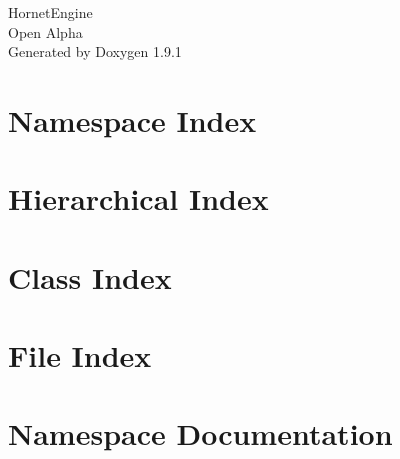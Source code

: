\let\mypdfximage\pdfximage\def\pdfximage{\immediate\mypdfximage}\documentclass[twoside]{book}
\newcommand{\+}{\discretionary{\mbox{\scriptsize$\hookleftarrow$}}{}{}}
\newcommand{\clearemptydoublepage}{%
  \newpage{\pagestyle{empty}\cleardoublepage}%
}
\begin{document}
\raggedbottom

\hypersetup{pageanchor=false,
             bookmarksnumbered=true,
             pdfencoding=unicode
            }
\begin{titlepage}
\vspace*{7cm}
\begin{center}%
{\Large Hornet\+Engine \\[1ex]\large Open Alpha }\\
\vspace*{1cm}
{\large Generated by Doxygen 1.9.1}\\
\end{center}
\end{titlepage}
\clearemptydoublepage
{}
\tableofcontents
\clearemptydoublepage
{}
\hypersetup{pageanchor=true}

\chapter{Namespace Index}

\chapter{Hierarchical Index}

\chapter{Class Index}

\chapter{File Index}

\chapter{Namespace Documentation}











\end{document}
